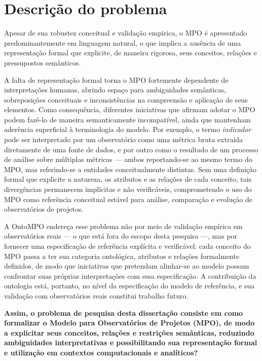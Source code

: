 \section{Descrição do problema}
Apesar de sua robustez conceitual e validação empírica, o MPO \cite{vieira2022thesis} é apresentado predominantemente em linguagem natural, o que implica a ausência de uma representação formal que explicite, de maneira rigorosa, seus conceitos, relações e pressupostos semânticos.

A falta de representação formal torna o MPO fortemente dependente de interpretações humanas, abrindo espaço para ambiguidades semânticas, sobreposições conceituais e inconsistências na compreensão e aplicação de seus elementos. Como consequência, diferentes iniciativas que afirmam adotar o MPO podem fazê-lo de maneira semanticamente incompatível, ainda que mantenham aderência superficial à terminologia do modelo. Por exemplo, o termo \textit{indicador} pode ser interpretado por um observatório como uma métrica bruta extraída diretamente de uma fonte de dados, e por outro como o resultado de um processo de análise sobre múltiplas métricas --- ambos reportando-se ao mesmo termo do MPO, mas referindo-se a entidades conceitualmente distintas. Sem uma definição formal que explicite a natureza, os atributos e as relações de cada conceito, tais divergências permanecem implícitas e não verificáveis, comprometendo o uso do MPO como referência conceitual estável para análise, comparação e evolução de observatórios de projetos.

A OntoMPO endereça esse problema não por meio de validação empírica em observatórios reais --- o que está fora do escopo desta pesquisa ---, mas por fornecer uma
especificação de referência explícita e verificável: cada conceito do MPO passa a ter sua categoria ontológica, atributos e relações formalmente
definidos, de modo que iniciativas que pretendam alinhar-se ao modelo possam confrontar suas próprias interpretações com essa especificação. A contribuição da ontologia está, portanto, no nível da especificação
do modelo de referência, e sua validação com observatórios reais constitui
trabalho futuro.

\textbf{Assim, o problema de pesquisa desta dissertação consiste em como formalizar o Modelo para Observatórios de Projetos (MPO), de modo a explicitar seus conceitos, relações e restrições semânticas, reduzindo ambiguidades interpretativas e possibilitando sua representação formal e utilização em contextos computacionais e analíticos?}


